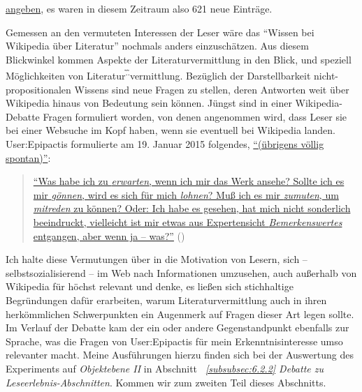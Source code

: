 \documentclass[fontsize=12pt]{scrartcl}
\begin{document}
\href{https://de.wikipedia.org/w/index.php?title=Wikipedia:Projektdiskussion/Mehr_Artikel_zu_literarischen_Werken&oldid=135954188}{angeben}, es waren in diesem Zeitraum also 621 neue Eintr\"age.

Gemessen an den vermuteten Interessen der Leser\textsuperscript{\tiny *} w\"are das "`Wissen bei Wi\-ki\-pe\-dia \"uber Li\-te\-ra\-tur"' nochmals anders einzusch\"atzen. Aus diesem Blickwinkel kommen Aspekte der Li\-te\-ra\-tur\-ver\-mitt\-lung in den Blick, und speziell M\"oglichkei\-ten von Li\-te\-ra\-tur\textsuperscript{\~.\~.}\-ver\-mitt\-lung. Bez\"uglich der Darstellbarkeit nicht-pro\-po\-si\-ti\-o\-na\-len Wissens sind neue Fragen zu stellen, deren Antworten weit \"uber Wi\-ki\-pe\-dia hinaus von Bedeutung sein k\"onnen. J\"ungst sind in einer Wi\-ki\-pe\-dia-Debatte Fragen formuliert worden, von denen an\-ge\-nom\-men wird, dass Leser\textsuperscript{\tiny *} sie bei einer Websuche im Kopf haben, wenn sie eventuell bei Wi\-ki\-pe\-dia landen. \mbox{User}:Epipactis formulierte am 19. Januar 2015 folgendes, \href{https://de.wikipedia.org/w/index.php?title=Benutzer_Diskussion:Grillenwaage\&diff=137961506\&oldid=137943802}{"`(\"ubrigens v\"ollig spontan)"'}:

\singlespacing
\begin{quote}
\href{https://de.wikipedia.org/w/index.php?title=Benutzer_Diskussion:Grillenwaage\&diff=next\&oldid=137663350}{"`Was habe ich zu \textit{erwarten}, wenn ich mir das Werk ansehe? Sollte ich es mir \textit{g\"onnen}, wird es sich f\"ur mich \textit{lohnen}? Mu{\ss} ich es mir \textit{zumuten}, um \textit{mitreden} zu k\"onnen? Oder: Ich habe es gesehen, hat mich nicht sonderlich beeindruckt, vielleicht ist mir etwas aus Expertensicht \textit{Bemerkenswertes} entgangen, aber wenn ja -- was?"'} (\cite{UserEpipactis2015a})
\end{quote}
\onehalfspacing 

Ich halte diese Vermutungen \"uber in die Motivation von Lesern\textsuperscript{\tiny *}, sich -- selbst\-sozialisierend -- im Web nach Informationen umzusehen, auch au{\ss}erhalb von Wi\-ki\-pe\-dia f\"ur h\"ochst relevant und denke, es lie{\ss}en sich stichhaltige Begr\"undungen daf\"ur erarbei\-ten, warum Li\-te\-ra\-tur\-ver\-mitt\-lung auch in ihren herk\"ommlichen Schwerpunkten ein Augenmerk auf Fragen dieser Art legen sollte. Im Verlauf der Debatte kam der ein oder andere Gegenstandpunkt ebenfalls zur Sprache, was die Fragen von \mbox{User}:Epipactis f\"ur mein Erkenntnisinteresse umso relevanter macht. Meine Ausf\"uh\-rungen hierzu finden sich bei der Auswertung des Experiments auf \textit{Objektebene II} in Abschnitt \textit{~\ref{subsubsec:6.2.2} Debatte zu Leseerlebnis-Abschnitten}. Kommen wir zum zwei\-ten Teil dieses Abschnitts. 
\end{document}
